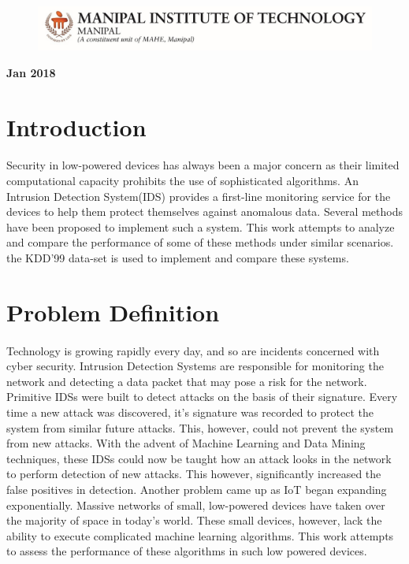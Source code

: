 \documentclass[a4paper,12pt]{article}
\begin{document}
\begin{titlepage}
		\begin{figure}[h]
	  	\begin{center}
		\includegraphics{MITLogo}
		\end{center}
		\end{figure}
		\begin{center}
		\textbf{Jan 2018}
		\end{center}

	\end{titlepage}


	\newpage
	
	\section{Introduction}
	\paragraph{}
	Security in low-powered devices has always been a major concern as their limited computational capacity prohibits the use of sophisticated algorithms. An Intrusion Detection System(IDS) provides a first-line monitoring service for the devices to help them protect themselves against anomalous data. Several methods have been proposed to implement such a system. This work attempts to analyze and compare the performance of some of these methods under similar scenarios. the KDD'99 data-set is used to implement and compare these systems. 
	
	\section{Problem Definition}	
	\paragraph{}
	Technology is growing rapidly every day, and so are incidents concerned with cyber security. Intrusion Detection Systems are responsible for monitoring the network and detecting a data packet that may pose a risk for the network. Primitive IDSs were built to detect attacks on the basis of their signature. Every time a new attack was discovered, it's signature was recorded to protect the system from similar future attacks. This, however, could not prevent the system from new attacks. With the advent of Machine Learning and Data Mining techniques, these IDSs could now be taught how an attack looks in the network to perform detection of new attacks. This however, significantly increased the false positives in detection. Another problem came up as IoT began expanding exponentially. Massive networks of small, low-powered devices have taken over the majority of space in today's world. These small devices, however, lack the ability to execute complicated machine learning algorithms. This work attempts to assess the performance of these algorithms in such low powered devices.
	
\end{document}
